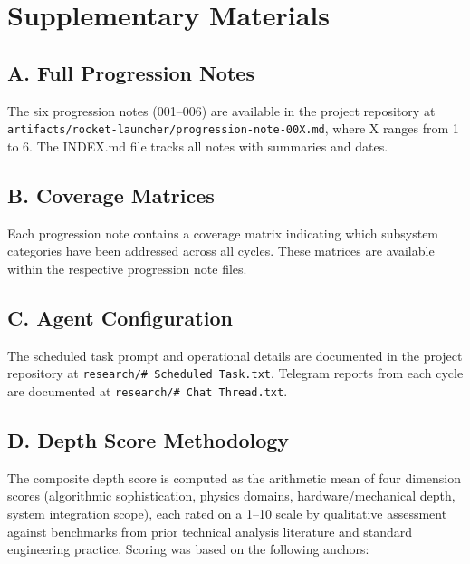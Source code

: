 \documentclass[11pt,letterpaper]{article}
\begin{document}
\section*{Supplementary Materials}

\subsection*{A. Full Progression Notes}

The six progression notes (001--006) are available in the project repository at \texttt{artifacts/rocket-launcher/progression-note-00X.md}, where X ranges from 1 to 6. The INDEX.md file tracks all notes with summaries and dates.

\subsection*{B. Coverage Matrices}

Each progression note contains a coverage matrix indicating which subsystem categories have been addressed across all cycles. These matrices are available within the respective progression note files.

\subsection*{C. Agent Configuration}

The scheduled task prompt and operational details are documented in the project repository at \texttt{research/\# Scheduled Task.txt}. Telegram reports from each cycle are documented at \texttt{research/\# Chat Thread.txt}.

\subsection*{D. Depth Score Methodology}

The composite depth score is computed as the arithmetic mean of four dimension scores (algorithmic sophistication, physics domains, hardware/mechanical depth, system integration scope), each rated on a 1--10 scale by qualitative assessment against benchmarks from prior technical analysis literature and standard engineering practice. Scoring was based on the following anchors:
\end{document}
